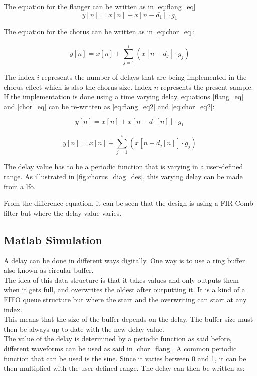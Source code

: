 The equation for the flanger can be written as in \autoref{eq:flang_eq}
\begin{equation}
\label{eq:flang_eq}
		y[n] = x[n] + x[n- d_{1}] \cdot g_{1}  
\end{equation}

The equation for the chorus can be written as in \autoref{eq:chor_eq}:

\begin{equation}
\label{eq:chor_eq}
y[n] = x[n] + \sum_{j=1}^{i}  (x[n- d_{j}] \cdot g_{j})
\end{equation}

The index $i$ represents the number of delays that are being implemented in the chorus effect which is also the chorus size. Index $n$ represents the present sample. \\
If the implementation is done using a time varying delay, equations \ref{flang_eq} and \ref{chor_eq} can be re-written as \autoref{eq:flang_eq2} and \autoref{eq:chor_eq2}:

\begin{equation}
\label{eq:flang_eq2}
y[n] = x[n] + x[n- d_{1}[n]] \cdot g_{1}  
\end{equation}

\begin{equation}
\label{eq:chor_eq2}
y[n] = x[n] + \sum_{j=1}^{i}  (x[n- d_{j}[n]] \cdot g_{j})
\end{equation}

The delay value has to be a periodic function that is varying in a user-defined range. As illustrated in \autoref{fig:chorus_diag_des}, this varying delay can be made from a \gls{lfo}.

From the difference equation, it can be seen that the design is using a FIR Comb filter but where the delay value varies. 


\subsection{Matlab Simulation}

A delay can be done in different ways digitally. One way is to use a ring buffer also known as circular buffer. \\
The idea of this data structure is that it takes values and only outputs them when it gets full, and overwrites the oldest after outputting it. It is a kind of a FIFO queue structure but where the start and the overwriting can start at any index. \\
This means that the size of the buffer depends on the delay.  The buffer size must then be always up-to-date with the new delay value. \\ 
The value of the delay is determined by a periodic function as said before, different waveforms can be used as said in \autoref{chor_flang}. A common periodic function that can be used is the sine. Since it varies between 0 and 1, it can be then multiplied with the user-defined range. 
The delay can then be written as:

